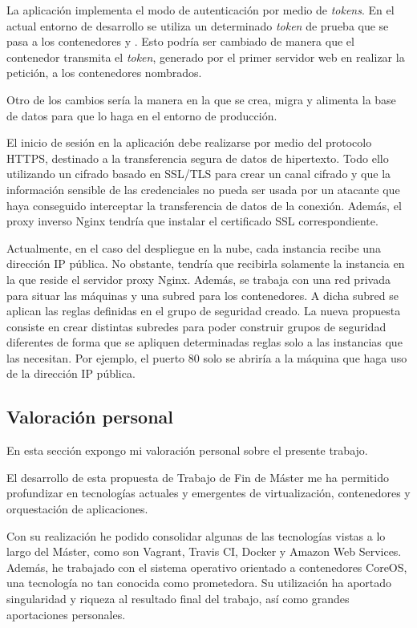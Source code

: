 La aplicación implementa el modo de autenticación por medio de \textit{tokens}. En el actual entorno de desarrollo se utiliza un determinado \textit{token} de prueba que se pasa a los contenedores  y . Esto podría ser cambiado de manera que el contenedor  transmita el \textit{token}, generado por el primer servidor web en realizar la petición, a los contenedores nombrados.

Otro de los cambios sería la manera en la que se crea, migra y alimenta la base de datos para que lo haga en el entorno de producción. 

El inicio de sesión en la aplicación debe realizarse por medio del protocolo HTTPS, destinado a la transferencia segura de datos de hipertexto. Todo ello utilizando un cifrado basado en SSL/TLS para crear un canal cifrado y que la información sensible de las credenciales no pueda ser usada por un atacante que haya conseguido interceptar la transferencia de datos de la conexión. Además, el proxy inverso Nginx tendría que instalar el certificado SSL correspondiente.

Actualmente, en el caso del despliegue en la nube, cada instancia recibe una dirección IP pública. No obstante, tendría que recibirla solamente la instancia en la que reside el servidor proxy Nginx. Además, se trabaja con una red privada para situar las máquinas y una subred para los contenedores. A dicha subred se aplican las reglas definidas en el grupo de seguridad creado. La nueva propuesta consiste en crear distintas subredes para poder construir grupos de seguridad diferentes de forma que se apliquen determinadas reglas solo a las instancias que las necesitan. Por ejemplo, el puerto 80 solo se abriría a la máquina que haga uso de la dirección IP pública.

\subsection{Valoración personal}

En esta sección expongo mi valoración personal sobre el presente trabajo.

El desarrollo de esta propuesta de Trabajo de Fin de Máster me ha permitido profundizar en tecnologías actuales y emergentes de virtualización, contenedores y orquestación de aplicaciones.

Con su realización he podido consolidar algunas de las tecnologías vistas a lo largo del Máster, como son Vagrant, Travis CI, Docker y Amazon Web Services. Además, he trabajado con el sistema operativo orientado a contenedores CoreOS, una tecnología no tan conocida como prometedora. Su utilización ha aportado singularidad y riqueza al resultado final del trabajo, así como grandes aportaciones personales.

